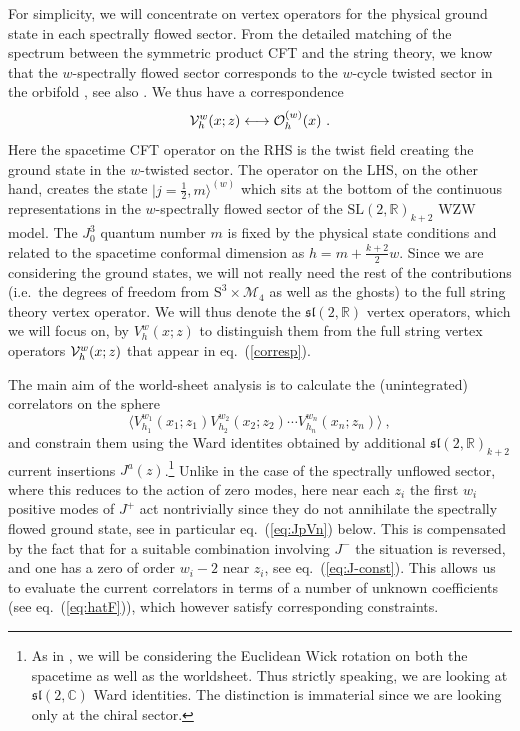 \documentclass[12pt,a4paper]{article}
\newcommand{\be}{\begin{equation}}
\newcommand{\ee}{\end{equation}}
\begin{document}
For simplicity, we will concentrate on vertex operators for the physical ground state in each spectrally flowed sector. From the detailed matching of the spectrum between the symmetric product CFT and the string theory, we know that the $w$-spectrally flowed sector corresponds to the $w$-cycle twisted sector in the orbifold \cite{Gaberdiel:2018rqv,Eberhardt:2018ouy}, see also \cite{Giveon:2005mi,Giribet:2018ada}. We thus have a correspondence
\be
\mathcal{V}^{w}_{h}(x; z) \longleftrightarrow {\cal O}^{(w)}_{h}(x) \ .
\ee
Here the spacetime CFT operator on the RHS is the twist field creating the ground state in the $w$-twisted sector. The operator on the LHS, on the other hand, creates the state $|j=\frac{1}{2}, m \rangle^{(w)}$ which sits at the bottom of the continuous representations in the $w$-spectrally flowed sector of the $\mathrm{SL}(2, \mathds{R})_{k+2}$ WZW model. The $J^3_0$ quantum number $m$ is fixed by the physical state conditions and related to the spacetime conformal dimension as $h=m+\frac{k+2}{2}w$. 
Since we are considering the ground states, we will not really need the rest of the contributions (i.e.\ the degrees of freedom from $\mathrm{S}^3\times \mathcal{M}_4$ as well as the ghosts) to the full string theory vertex operator. We will thus denote the $\mathfrak{sl}(2, \mathds{R})$ vertex operators, which we will focus on, by  
$V_{h}^{w}(x;z)$ to distinguish them from the full string vertex operators ${\cal V}^{w}_{h}(x; z)$ that appear in  eq.~(\ref{corresp}). 

The main aim of the world-sheet analysis is to calculate the (unintegrated) correlators on the sphere
\be\label{gencorr} 
\langle V_{h_1}^{w_1}(x_1;z_1)V_{h_2}^{w_2}(x_2;z_2) \cdots V_{h_n}^{w_n}(x_n;z_n) \rangle \ ,
\ee
and constrain them using the Ward identites obtained by additional $\mathfrak{sl}(2, \mathds{R})_{k+2}$ current insertions $J^a(z)$.\footnote{As in \cite{Maldacena:2001km}, we will be considering the Euclidean Wick rotation on both the spacetime as well as the worldsheet. Thus strictly speaking, we are looking at $\mathfrak{sl}(2, \mathds{C})$ Ward identities. The distinction is immaterial since we are looking only at the chiral sector.} Unlike in the case of the spectrally unflowed sector, where this reduces to the action of zero modes, here near each $z_i$ the first $w_i$ positive modes of $J^+$ act nontrivially since they do not annihilate the spectrally flowed ground state, see in particular eq.~(\ref{eq:JpVn}) below. This is compensated by the fact that for a suitable combination involving $J^-$ the situation is reversed, and one has a zero of order $w_i-2$ near $z_i$, see eq.~(\ref{eq:J-const}). This allows us to evaluate the current correlators in terms of a number of unknown coefficients (see eq.~(\ref{eq:hatF})), which however satisfy corresponding constraints.  
\end{document}
